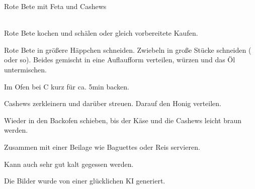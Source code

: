 
\begin{recipe}
[ %
    preparationtime = {\unit[15]{min}},
    bakingtime={\unit[20]{min}},
    bakingtemperature={\Fanoven\ \unit[180]{C}},
    portion = \portion{4},
    source = Malte
]
{Rote Bete mit Feta und Cashews}




\preparation
{ %
    \\
    Rote Bete kochen und schälen oder gleich vorbereitete Kaufen.

    Rote Bete in größere Häppchen schneiden.
    Zwiebeln in große Stücke schneiden ( oder so).
    Beides gemischt in eine Auflaufform verteilen, würzen und das Öl untermischen.

    Im Ofen bei \unit[180]{C} kurz für ca. 5min backen.

    Cashews zerkleinern und darüber streuen.
    Darauf den Honig verteilen.

    Wieder in den Backofen schieben, bis der Käse und die Cashews leicht braun werden.

    Zusammen mit einer Beilage wie Baguettes oder Reis servieren.
}

\hint
    {%
    Kann auch sehr gut kalt gegessen werden.

    Die Bilder wurde von einer glücklichen KI generiert.
}

\end{recipe}
